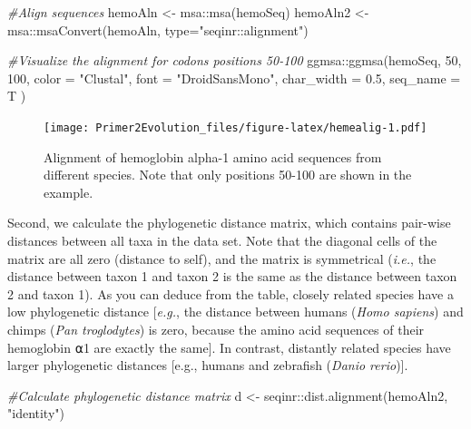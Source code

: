 \documentclass[
]{book}
\newenvironment{Shaded}{\begin{snugshade}}{\end{snugshade}}
\newcommand{\AttributeTok}[1]{\textcolor[rgb]{0.77,0.63,0.00}{#1}}
\newcommand{\CommentTok}[1]{\textcolor[rgb]{0.56,0.35,0.01}{\textit{#1}}}
\newcommand{\DecValTok}[1]{\textcolor[rgb]{0.00,0.00,0.81}{#1}}
\newcommand{\FloatTok}[1]{\textcolor[rgb]{0.00,0.00,0.81}{#1}}
\newcommand{\FunctionTok}[1]{\textcolor[rgb]{0.00,0.00,0.00}{#1}}
\newcommand{\NormalTok}[1]{#1}
\newcommand{\OtherTok}[1]{\textcolor[rgb]{0.56,0.35,0.01}{#1}}
\newcommand{\SpecialCharTok}[1]{\textcolor[rgb]{0.00,0.00,0.00}{#1}}
\newcommand{\StringTok}[1]{\textcolor[rgb]{0.31,0.60,0.02}{#1}}
\begin{document}
\begin{Shaded}
\begin{Highlighting}[]
\CommentTok{\#Align sequences}
\NormalTok{hemoAln }\OtherTok{\textless{}{-}}\NormalTok{ msa}\SpecialCharTok{::}\FunctionTok{msa}\NormalTok{(hemoSeq)}
\NormalTok{hemoAln2 }\OtherTok{\textless{}{-}}\NormalTok{ msa}\SpecialCharTok{::}\FunctionTok{msaConvert}\NormalTok{(hemoAln, }\AttributeTok{type=}\StringTok{"seqinr::alignment"}\NormalTok{)}
\end{Highlighting}
\end{Shaded}

\begin{Shaded}
\begin{Highlighting}[]
\CommentTok{\#Visualize the alignment for codons positions 50{-}100}
\NormalTok{ggmsa}\SpecialCharTok{::}\FunctionTok{ggmsa}\NormalTok{(hemoSeq, }\DecValTok{50}\NormalTok{, }\DecValTok{100}\NormalTok{, }\AttributeTok{color =} \StringTok{"Clustal"}\NormalTok{, }\AttributeTok{font =} \StringTok{"DroidSansMono"}\NormalTok{, }\AttributeTok{char\_width =} \FloatTok{0.5}\NormalTok{, }\AttributeTok{seq\_name =}\NormalTok{ T )}
\end{Highlighting}
\end{Shaded}

\begin{figure}
\centering
\texttt{[image: Primer2Evolution\_files/figure-latex/hemealig-1.pdf]}
\caption{\label{fig:hemealig}Alignment of hemoglobin alpha-1 amino acid sequences from different species. Note that only positions 50-100 are shown in the example.}
\end{figure}

Second, we calculate the phylogenetic distance matrix, which contains pair-wise distances between all taxa in the data set. Note that the diagonal cells of the matrix are all zero (distance to self), and the matrix is symmetrical (\emph{i.e.}, the distance between taxon 1 and taxon 2 is the same as the distance between taxon 2 and taxon 1). As you can deduce from the table, closely related species have a low phylogenetic distance {[}\emph{e.g.}, the distance between humans (\emph{Homo sapiens}) and chimps (\emph{Pan troglodytes}) is zero, because the amino acid sequences of their hemoglobin ⍺1 are exactly the same{]}. In contrast, distantly related species have larger phylogenetic distances {[}e.g., humans and zebrafish (\emph{Danio rerio}){]}.

\begin{Shaded}
\begin{Highlighting}[]
\CommentTok{\#Calculate phylogenetic distance matrix}
\NormalTok{d }\OtherTok{\textless{}{-}}\NormalTok{ seqinr}\SpecialCharTok{::}\FunctionTok{dist.alignment}\NormalTok{(hemoAln2, }\StringTok{"identity"}\NormalTok{)}
\end{Highlighting}
\end{Shaded}
\end{document}
